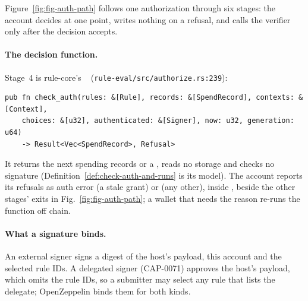 Figure~\ref{fig:fig-auth-path} follows one authorization through six stages:
the account decides at one point, writes nothing on a refusal, and calls the
verifier only after the decision accepts.


\paragraph{The decision function.} Stage~4 is rule-core's
~
(\nolinkurl{rule-eval/src/authorize.rs:239}):
\begin{Verbatim}[fontsize=\scriptsize,xleftmargin=1em]
pub fn check_auth(rules: &[Rule], records: &[SpendRecord], contexts: &[Context],
    choices: &[u32], authenticated: &[Signer], now: u32, generation: u64)
    -> Result<Vec<SpendRecord>, Refusal>
\end{Verbatim}
It returns the next spending records or a , reads no storage and
checks no signature (Definition~\ref{def:check-auth-and-runs} is its model). The
account reports its refusals as auth error  (a
stale grant) or  (any other), inside
, beside the other stages' exits in
Fig.~\ref{fig:fig-auth-path}; a wallet that needs the reason re-runs the
function off chain.

\paragraph{What a signature binds.} An external signer signs a digest of the
host's payload, this account and the selected rule IDs. A delegated signer
(CAP-0071) approves the host's payload, which omits the rule IDs, so a submitter
may select any rule that lists the delegate; OpenZeppelin 
binds them for both kinds.
